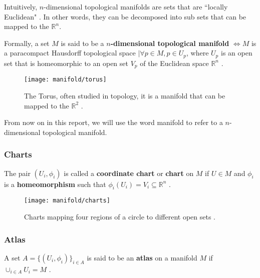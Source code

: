 Intuitively, $n$-dimensional topological manifolds are sets that are ``locally Euclidean" \cite{lee2009}. In other words, they can be decomposed into sub sets that can be mapped to the $\mathbb{R}^n$.

Formally, a set $M$ is said to be a \textbf{$n$-dimensional topological manifold} $\iff M$ is a paracompact Hausdorff topological space $\mid \forall p \in M, p \in U_p$, where $U_p$ is an open set that is homeomorphic to an open set $V_p$ of the Euclidean space $\mathbb{R}^n$ \cite{lee2009}.

\begin{figure}[H]
	\centering
	\captionsetup{justification=centering}
	\texttt{[image: manifold/torus]}
	\caption{The Torus, often studied in topology, it is a manifold that can be mapped to the $\mathbb{R}^2$ \protect\footnotemark.}
	\label{fig:mani_torus}
\end{figure}


From now on in this report, we will use the word manifold to refer to a $n$-dimensional topological manifold.

\subsubsection{Charts}
The pair $(U_i, \phi_i)$ is called a \textbf{coordinate chart} or \textbf{chart} on $M$ if $U \in M$ and $\phi_i$ is a \textbf{homeomorphism} such that $\phi_i(U_i) = V_i \subseteq \mathbb{R}^n$ \cite{lee2002}.

\begin{figure}[H]
	\centering
	\captionsetup{justification=centering}
	
	\texttt{[image: manifold/charts]}
	\caption{Charts mapping four regions of a circle to different open sets \protect\footnotemark.}
	\label{fig:mani_charts}
\end{figure}


\subsubsection{Atlas}
A set $A = \{(U_i, \phi_i)\}_{i \in A}$ is said to be an \textbf{atlas} on a manifold $M$ if $\cup_{i \in A} U_i = M$ \cite{lee2002}.

